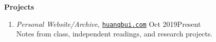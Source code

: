 \documentclass[10pt]{article}
\begin{document}



\noindent \large{\textbf{{Projects}}}\normalsize \vspace{-5pt} 
\begin{enumerate}
	\item \noindent \textit{Personal Website/Archive,}
	\href{https://huanqbui.com}{\texttt{huanqbui.com}} \hfill {Oct 2019\textendash Present} \\
	\noindent Notes from class, independent readings, and research projects.
\end{enumerate}












%
%
%












\end{document}
